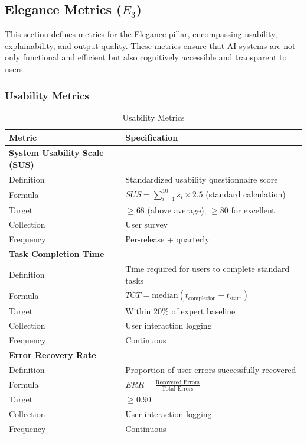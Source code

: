 \subsection{Elegance Metrics (\texorpdfstring{$E_3$}{E3})}

This section defines metrics for the Elegance pillar, encompassing usability, explainability, and output quality. These metrics ensure that AI systems are not only functional and efficient but also cognitively accessible and transparent to users.

\subsubsection{Usability Metrics}

\begin{table}[!htbp]
\centering
\caption{Usability Metrics}
\label{tab:usability_metrics}
\small
\begin{tabularx}{\linewidth}{@{}l X@{}}
\toprule
\textbf{Metric} & \textbf{Specification} \\
\midrule
\textbf{System Usability Scale (SUS)} & \\
Definition & Standardized usability questionnaire score \\
Formula & $SUS = \sum_{i=1}^{10} s_i \times 2.5$ (standard calculation) \\
Target & $\geq 68$ (above average); $\geq 80$ for excellent \\
Collection & User survey \\
Frequency & Per-release + quarterly \\
\addlinespace

\textbf{Task Completion Time} & \\
Definition & Time required for users to complete standard tasks \\
Formula & $TCT = \text{median}(t_{\text{completion}} - t_{\text{start}})$ \\
Target & Within 20\% of expert baseline \\
Collection & User interaction logging \\
Frequency & Continuous \\
\addlinespace

\textbf{Error Recovery Rate} & \\
Definition & Proportion of user errors successfully recovered \\
Formula & $ERR = \frac{\text{Recovered Errors}}{\text{Total Errors}}$ \\
Target & $\geq 0.90$ \\
Collection & User interaction logging \\
Frequency & Continuous \\
\addlinespace


\end{tabularx}
\end{table}
